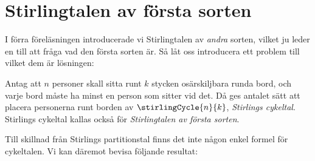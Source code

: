 \documentclass[nobib]{tufte-handout}
\begin{document}
\section{Stirlingtalen av första sorten}

I förra föreläsningen introducerade vi Stirlingtalen av \emph{andra} sorten, vilket ju leder en till att fråga vad den första sorten är. Så låt oss introducera ett problem till vilket dem är lösningen:

\begin{definition}
  Antag att $n$ personer skall sitta runt $k$ stycken osärskiljbara runda bord, och varje bord måste ha minst en person som sitter vid det. Då ges antalet sätt att placera personerna runt borden av $\stirlingCycle{n}{k}$, \emph{Stirlings cykeltal}. Stirlings cykeltal kallas också för \emph{Stirlingtalen av första sorten}.
\end{definition}

Till skillnad från Stirlings partitionstal finns det inte någon enkel formel för cykeltalen. Vi kan däremot bevisa följande resultat:
\end{document}
